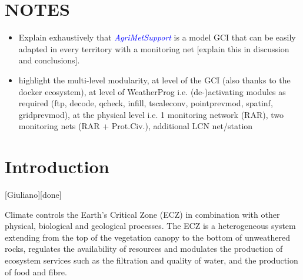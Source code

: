 \documentclass[authoryear,preprint,review,12pt]{elsarticle}
\newcommand{\update}[1]{\emph{\textcolor{blue}{#1}}}
\newcommand{\gci}{\update{AgriMetSupport}\xspace}
\begin{document}
\section{NOTES}
\begin{itemize}
    \item Explain exhaustively that \gci is a model GCI that can be easily adapted in every territory with a monitoring net [explain this in discussion and conclusions].
    \item highlight the multi-level modularity, at level of the GCI (also thanks to the docker ecosystem), at level of WeatherProg i.e. (de-)activating modules as required (ftp, decode, qcheck, infill, tscaleconv, pointprevmod, spatinf, gridprevmod), at the physical level i.e. 1 monitoring network (RAR), two monitoring nets (RAR + Prot.Civ.), additional LCN net/station
\end{itemize}






\section{Introduction}[Giuliano][done]



Climate controls the Earth's Critical Zone (ECZ) in combination with other physical, biological and geological processes.
The ECZ is a heterogeneous system extending from the top of the vegetation canopy to the bottom of unweathered rocks, regulates the availability of resources and modulates the production of ecosystem services such as the filtration and quality of water, and the production of food and fibre.
\end{document}
